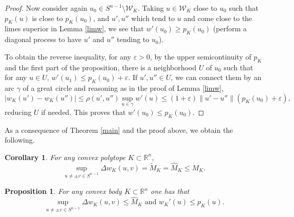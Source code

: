 \documentclass[a4paper,12pt]{amsart}
\newtheorem{prop}[thm]{Proposition}
\newtheorem{cor}[thm]{Corollary}
\def\R{\mathbb R}
\def\eps{\varepsilon}
\begin{document}
\begin{proof}
Now consider again $u_0 \in S^{n-1}\setminus \mathcal W_K$.
Taking $u \in \mathcal W_K$ close to $u_0$ such that $p_K(u)$
is close to $p_K(u_0)$, and $u',u''$ which tend to $u$ and
come close to the limes superior in Lemma \ref{limw}, we see
that $w'(u_0) \ge p_K(u_0)$ (perform a diagonal process
to have $u'$ and $u''$ tending to $u_0$).

To obtain the reverse inequality, for any $\eps>0$, by the upper semicontinuity
of $p_K$ and the first part of the proposition, there is a neighborhood $U$
of $u_0$ such that for any $u \in U$, $w'(u_1)\le p_K(u_0)+\eps$. If $u', u''\in U$,
we can connect them by an arc $\gamma$ of a great circle and reasoning as in the proof of
Lemma \ref{limw},
\[
|w_K(u')-w_K(u'')|\le \rho(u',u'') \sup_{u\in \gamma} w'(u)
\le (1+\eps) \|u'-u''\| (p_K(u_0)+\eps) ,
\]
reducing $U$ if needed. This proves that $w'(u_0) \le p_K(u_0)$.
\end{proof}

As a consequence of Theorem \ref{main} and the proof above, we obtain the following.
\begin{cor}
\label{global}
For any convex polytope $K\subset \R^n$,
\[
\sup_{u\neq \pm v \in S^{n-1} } \Delta w_K(u,v)
= \tilde M_K=\hat M_K \le M_K.
\]
\end{cor}

\begin{prop}
\label{bodies}
For any convex body $K\subset \R^n$ one has that
$$
\sup_{u\neq \pm v \in S^{n-1} } \Delta w_K(u,v) \le \hat M_K\mbox{\ \ and\ \ }w_K'(u)\le p_K(u).
$$
\end{prop}
\end{document}
